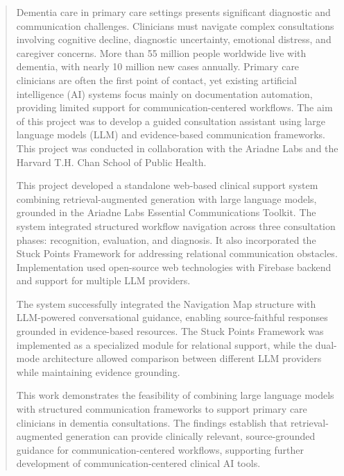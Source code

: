 \begin{abstract}

Dementia care in primary care settings presents significant diagnostic and communication challenges. Clinicians must navigate complex consultations involving cognitive decline, diagnostic uncertainty, emotional distress, and caregiver concerns. More than 55 million people worldwide live with dementia, with nearly 10 million new cases annually. Primary care clinicians are often the first point of contact, yet existing artificial intelligence (AI) systems focus mainly on documentation automation, providing limited support for communication-centered workflows. The aim of this project was to develop a guided consultation assistant using large language models (LLM) and evidence-based communication frameworks. This project was conducted in collaboration with the Ariadne Labs and the Harvard T.H. Chan School of Public Health.

This project developed a standalone web-based clinical support system combining retrieval-augmented generation with large language models, grounded in the Ariadne Labs Essential Communications Toolkit. The system integrated structured workflow navigation across three consultation phases: recognition, evaluation, and diagnosis. It also incorporated the Stuck Points Framework for addressing relational communication obstacles. Implementation used open-source web technologies with Firebase backend and support for multiple LLM providers.

The system successfully integrated the Navigation Map structure with LLM-powered conversational guidance, enabling source-faithful responses grounded in evidence-based resources. The Stuck Points Framework was implemented as a specialized module for relational support, while the dual-mode architecture allowed comparison between different LLM providers while maintaining evidence grounding.

This work demonstrates the feasibility of combining large language models with structured communication frameworks to support primary care clinicians in dementia consultations. The findings establish that retrieval-augmented generation can provide clinically relevant, source-grounded guidance for communication-centered workflows, supporting further development of communication-centered clinical AI tools.


\end{abstract}


